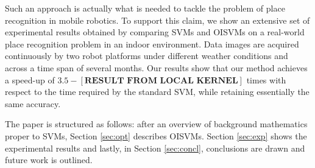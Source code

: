 Such an approach is actually what is needed to tackle the problem of
place recognition in mobile robotics. To support this claim, we show
an extensive set of experimental results obtained by comparing SVMs
and OISVMs on a real-world place recognition problem in an indoor
environment. Data images are acquired continuously by two robot
platforms under different weather conditions and across a time span of
several months. Our results show that our method achieves a speed-up
of $3.5-[\textbf{RESULT FROM LOCAL KERNEL}]$ times with respect to the time required by the standard SVM,
while retaining essentially the same accuracy.

The paper is structured as follows: after an overview  of background
mathematics proper to SVMs,  Section \ref{sec:opt} describes OISVMs.
Section \ref{sec:exp} shows the experimental results and
lastly, in Section \ref{sec:concl}, conclusions are drawn and future
work is outlined.
